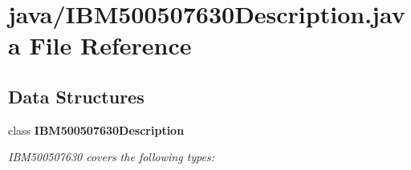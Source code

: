 \section{java/\+I\+B\+M500507630\+Description.java File Reference}
\label{IBM500507630Description_8java}
\subsection*{Data Structures}
\begin{DoxyCompactItemize}
\item 
class {\bf I\+B\+M500507630\+Description}
\begin{DoxyCompactList}\small\item\em I\+B\+M500507630 covers the following types\+: \end{DoxyCompactList}\end{DoxyCompactItemize}
